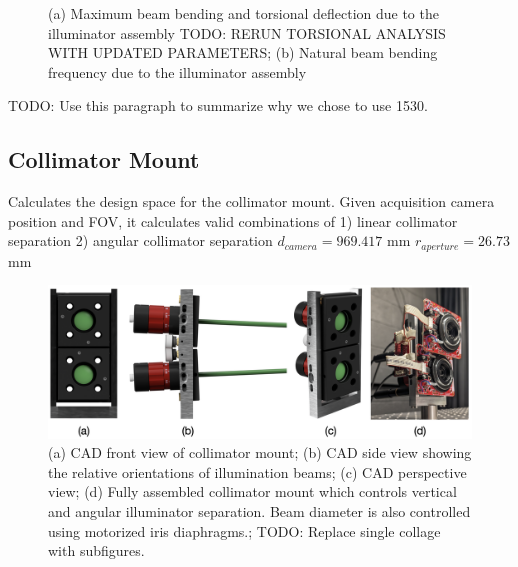 \begin{figure}
\begin{subfigure}{0.49\textwidth}
        \caption{}
        \label{fig:structural_natural_frequency}
    \end{subfigure}
    \caption{(a) Maximum beam bending and torsional deflection due to the illuminator assembly TODO: RERUN TORSIONAL ANALYSIS WITH UPDATED PARAMETERS; (b) Natural beam bending frequency due to the illuminator assembly}
    \label{fig:structural_final_results}
\end{figure}

TODO: Use this paragraph to summarize why we chose to use 1530.

\subsection{Collimator Mount}
Calculates the design space for the collimator mount.
Given acquisition camera position and FOV, it calculates valid combinations of 
    1) linear collimator separation
    2) angular collimator separation
$d_{camera} = 969.417$ mm
$r_{aperture} = 26.73$ mm

\begin{figure}
    \centering
    \includegraphics[width=\linewidth]{../figures/collimator_assembly_summary.png}
    \caption{(a) CAD front view of collimator mount; (b) CAD side view showing the relative orientations of illumination beams; (c) CAD perspective view; (d) Fully assembled collimator mount which controls vertical and angular illuminator separation. Beam diameter is also controlled using motorized iris diaphragms.; TODO: Replace single collage with subfigures.}
    \label{fig:collimator_mount}
\end{figure}

